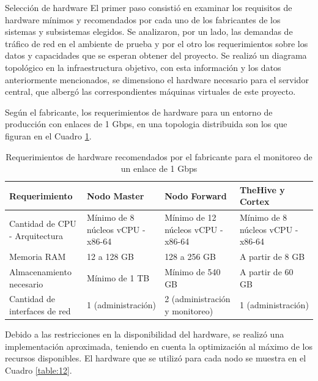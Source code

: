     
    \begin{section}{Selección de hardware}
    \label{seleccion_hw}
        El primer paso consistió en examinar los requisitos de hardware mínimos y recomendados por cada uno de los fabricantes de los sistemas y subsistemas elegidos. Se analizaron, por un lado, las demandas de tráfico de red en el ambiente de prueba y por el otro los requerimientos sobre los datos y capacidades que se esperan obtener del proyecto. Se realizó un diagrama topológico en la infraestructura objetivo, con esta información y los datos anteriormente mencionados, se dimensiono el hardware necesario para el servidor central, que albergó las correspondientes máquinas virtuales de este proyecto.\par
        Según el fabricante, los requerimientos de hardware para un entorno de producción con enlaces de 1 Gbps, en una topologia distribuida son los que figuran en el Cuadro \ref{table:5}.
        
        \begin{table}[H]
        \centering
        \begin{tabular}{|m{9em}|m{9em}|m{9em}|m{9em}|}
        
            \hline 
                Requerimiento  & Nodo Master &  Nodo Forward & TheHive y Cortex \\ 
            \hline
                Cantidad de CPU - Arquitectura & Mínimo de 8 núcleos vCPU - x86-64 & Mínimo de 12 núcleos vCPU - x86-64 & Mínimo de 8 núcleos vCPU - x86-64 \\ 
            \hline
                Memoria RAM  & 12 a 128 GB & 128 a 256 GB & A partir de 8 GB \\ 
            \hline
                Almacenamiento necesario & Mínimo de 1 TB  & Mínimo de 540 GB & A partir de 60 GB \\
        \hline
        Cantidad de interfaces de red & 1 (administración) & 2 (administración y monitoreo) & 1 (administración) \\
            \hline %
        \end{tabular}
        \caption{Requerimientos de hardware recomendados por el fabricante para el monitoreo de un enlace de 1 Gbps}
        \label{table:5}
        \end{table}
        
        Debido a las restricciones en la disponibilidad del hardware, se realizó una implementación aproximada, teniendo en cuenta la optimización al máximo de los recursos disponibles. El hardware que se utilizó para cada nodo se muestra en el Cuadro \ref{table:12}. \par


\end{section}
